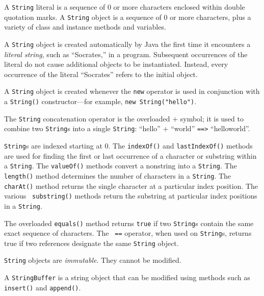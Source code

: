 \pagebreak
{}
\label{summaryof-important-points}
\begin{SMBL}
\item  A {\tt String} literal is a sequence of 0 or more characters
enclosed within double quotation marks.   A {\tt String} object is a
sequence of 0 or more characters, plus a variety of class and instance
methods and variables.

\item A {\tt String} object is created automatically by Java the first
time it encounters a {\it literal string}, such as ``Socrates,'' in a
program.  Subsequent occurrences of the literal do not cause
additional objects to be instantiated.  Instead, every occurrence of
the literal ``Socrates'' refers to the initial object.

\item A {\tt String} object is created whenever the {\tt new}
operator is used in conjunction with a {\tt String()}
constructor---for example, {\tt new String("hello")}.

\item  The {\tt String} concatenation operator is the overloaded
$+$ symbol; it is used to combine two {\tt String}s into a single
{\tt String}: ``hello'' + ``world'' \verb|==>| ``helloworld''.

\item {\tt String}s are indexed starting at 0.  The {\tt indexOf()}
and {\tt last\-Index\-Of()} methods are used for
finding the first or last occurrence of a character or substring
within a {\tt String}. The {\tt valueOf()} methods convert a nonstring
into a {\tt String}. The {\tt length()} method determines the number
of characters in a {\tt String}.  The {\tt charAt()} method returns
the single character at a particular index position.  The various {\tt
substring()} methods return the substring at particular index
positions in a {\tt String}.

\item The overloaded {\tt equals()} method returns {\tt true} if two
{\tt String}s contain the same exact sequence of characters.  The {\tt
==} operator, when used on {\tt String}s, returns true if two
references designate the same {\tt String} object.

\item {\tt String} objects are {\it immutable}. They cannot be 
modified.

\item  A {\tt StringBuffer} is a string object that can be 
modified using methods such as {\tt insert()} and {\tt append()}.


\end{SMBL}
